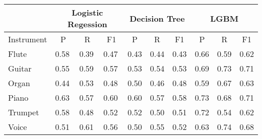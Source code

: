 \documentclass[conference]{IEEEtran}
\begin{document}
		\begin{table}[h!]					
			\centering\resizebox{9cm}{!} {
			\begin{tabular}{@{}l|lll|lll|lll@{}}
				\toprule
				& \multicolumn{3}{c}{\textbf{Logistic Regession}}                        & \multicolumn{3}{c}{\textbf{Decision Tree}}                             & \multicolumn{3}{c}{\textbf{LGBM}}                                      \\ \midrule
				Instrument & \multicolumn{1}{c}{P} & \multicolumn{1}{c}{R} & \multicolumn{1}{c}{F1} & \multicolumn{1}{c}{P} & \multicolumn{1}{c}{R} & \multicolumn{1}{c}{F1} & \multicolumn{1}{c}{P} & \multicolumn{1}{c}{R} & \multicolumn{1}{c}{F1}\\ 
				Flute      & 0.58                  & 0.39                  & 0.47                   & 0.43                  & 0.44                  & 0.43                   & 0.66                  & 0.59                  & 0.62                   \\
				Guitar      & 0.55                  & 0.59                  & 0.57                   & 0.53                  & 0.54                  & 0.53                   & 0.69                  & 0.73                  & 0.71                   \\
				Organ    & 0.44                  & 0.53                  & 0.48                   & 0.50                  & 0.46                  & 0.48                   & 0.59                  & 0.67                  & 0.63                   \\
				Piano     & 0.63                  & 0.57                  & 0.60                   & 0.60                  & 0.57                  & 0.58                   & 0.73                  & 0.68                  & 0.71                   \\
				Trumpet      & 0.58                  & 0.48                  & 0.52                   & 0.52                  & 0.50                  & 0.51                   & 0.72                  & 0.54                  & 0.62                   \\
				Voice      & 0.51                  & 0.61                  & 0.56                   & 0.50                  & 0.55                  & 0.52                   & 0.63                  & 0.74                  & 0.68                   \\ 
			\end{tabular}}
			

\end{table}
\end{document}
